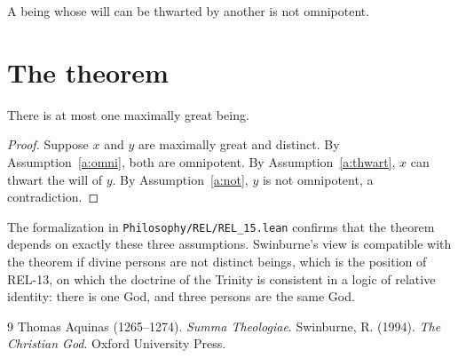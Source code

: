 \documentclass{situationist-preprint}
\begin{document}
\begin{assumption}\label{a:not}
A being whose will can be thwarted by another is not omnipotent.
\end{assumption}

\section{The theorem}

\begin{theorem}\label{t:main}
There is at most one maximally great being.
\end{theorem}

\begin{proof}
Suppose $x$ and $y$ are maximally great and distinct. By Assumption~\ref{a:omni}, both are omnipotent. By Assumption~\ref{a:thwart}, $x$ can thwart the will of $y$. By Assumption~\ref{a:not}, $y$ is not omnipotent, a contradiction.
\end{proof}

The formalization in \nolinkurl{Philosophy/REL/REL_15.lean} confirms that the theorem depends on exactly these three assumptions. Swinburne's view is compatible with the theorem if divine persons are not distinct beings, which is the position of REL-13, on which the doctrine of the Trinity is consistent in a logic of relative identity: there is one God, and three persons are the same God.

\begin{thebibliography}{9}\small
{} Thomas Aquinas (1265--1274). \emph{Summa Theologiae}.
 Swinburne, R. (1994). \emph{The Christian God}. Oxford University Press.
\end{thebibliography}
\end{document}
